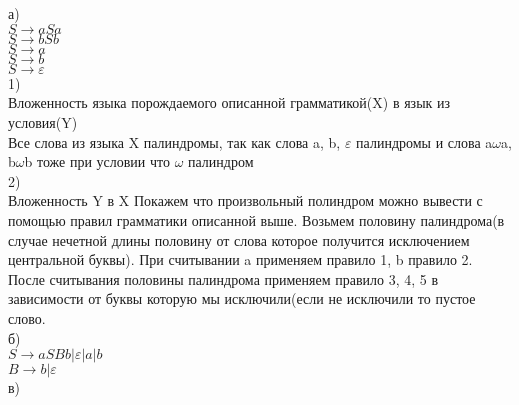 \documentclass[a4paper,12pt]{article}
\begin{document}
\section{}
а)\\
$S\rightarrow aSa$\\
$S\rightarrow bSb$\\
$S\rightarrow a$\\
$S\rightarrow b$\\
$S\rightarrow \varepsilon$\\
1)\\
Вложенность языка порождаемого описанной грамматикой(X) в язык из условия(Y)\\
Все слова из языка X палиндромы, так как слова a, b, $\varepsilon$ палиндромы и слова a$\omega$a, b$\omega$b тоже при условии что $\omega$ палиндром\\ 
2)\\
Вложенность Y в X
Покажем что произвольный полиндром можно вывести с помощью правил грамматики описанной выше. 
Возьмем половину палиндрома(в случае нечетной длины половину от слова которое получится исключением центральной буквы). При считывании a применяем правило 1, b правило 2. После считывания половины палиндрома применяем правило 3, 4, 5 в зависимости от буквы которую мы исключили(если не исключили то пустое слово.\\
б)\\
$S\rightarrow aSBb|\varepsilon|a|b$\\
$B\rightarrow b|\varepsilon$\\
в)\\
\end{document}
